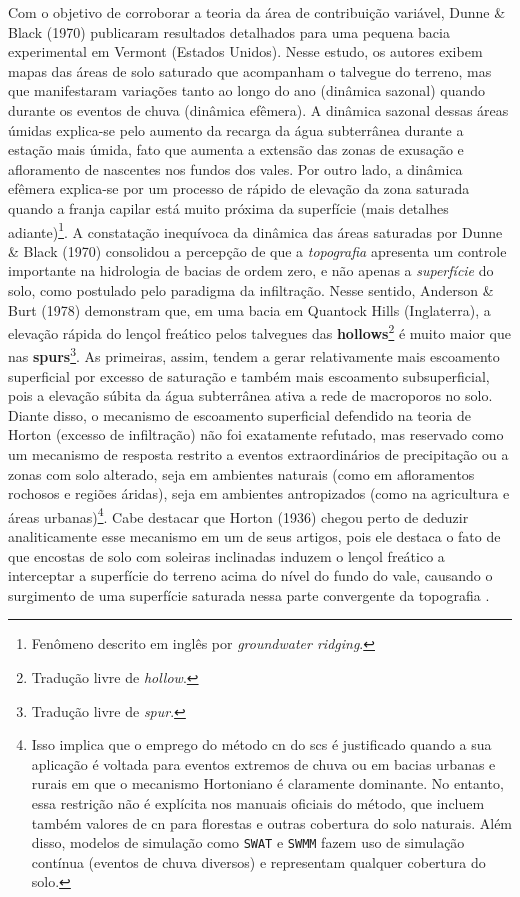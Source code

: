 \documentclass[./main.tex]{subfiles}
\begin{document}
\par Com o objetivo de corroborar a teoria da área de contribuição variável, Dunne \& Black (1970) \cite{Dunne1970} publicaram resultados detalhados para uma pequena bacia experimental em Vermont (Estados Unidos). Nesse estudo, os autores exibem mapas das áreas de solo saturado que acompanham o talvegue do terreno, mas que manifestaram variações tanto ao longo do ano (dinâmica sazonal) quando durante os eventos de chuva (dinâmica efêmera). A dinâmica sazonal dessas áreas úmidas explica-se pelo aumento da recarga da água subterrânea durante a estação mais úmida, fato que aumenta a extensão das zonas de exusação e afloramento de nascentes nos fundos dos vales. Por outro lado, a dinâmica efêmera explica-se por um processo de rápido de elevação da zona saturada quando a franja capilar está muito próxima da superfície (mais detalhes adiante)\footnote{Fenômeno descrito em inglês por \textit{groundwater ridging}.}. A constatação inequívoca da dinâmica das áreas saturadas por Dunne \& Black (1970) consolidou a percepção de que a \textit{topografia} apresenta um controle importante na hidrologia de bacias de ordem zero, e não apenas a \textit{superfície} do solo, como postulado pelo \gls{paradigma} da infiltração. Nesse sentido, Anderson \& Burt (1978) \cite{Anderson1978} demonstram que, em uma bacia em Quantock Hills (Inglaterra), a elevação rápida do lençol freático pelos talvegues das \textbf{\gls{hollows}}\footnote{Tradução livre de \textit{hollow}.} é muito maior que nas \textbf{\gls{spurs}}\footnote{Tradução livre de \textit{spur}.}. As primeiras, assim, tendem a gerar relativamente mais escoamento superficial por excesso de saturação e também mais escoamento subsuperficial, pois a elevação súbita da água subterrânea ativa a rede de macroporos no solo. Diante disso, o mecanismo de escoamento superficial defendido na teoria de Horton (excesso de infiltração) não foi exatamente refutado, mas reservado como um mecanismo de resposta restrito a eventos extraordinários de precipitação ou a zonas com solo alterado, seja em ambientes naturais (como em afloramentos rochosos e regiões áridas), seja em ambientes antropizados (como na agricultura e áreas urbanas)\footnote{Isso implica que o emprego do método \acrshort{cn} do \acrshort{scs} é justificado quando a sua aplicação é voltada para eventos extremos de chuva ou em bacias urbanas e rurais em que o mecanismo Hortoniano é claramente dominante. No entanto, essa restrição não é explícita nos manuais oficiais do método, que incluem também valores de \acrshort{cn} para florestas e outras cobertura do solo naturais. Além disso, modelos de simulação como \texttt{SWAT} e \texttt{SWMM} fazem uso de simulação contínua (eventos de chuva diversos) e representam qualquer cobertura do solo.}. Cabe destacar que Horton (1936) \cite{Horton1936} chegou perto de deduzir analiticamente esse mecanismo em um de seus artigos, pois ele destaca o fato de que encostas de solo com soleiras inclinadas induzem o lençol freático a interceptar a superfície do terreno acima do nível do fundo do vale, causando o surgimento de uma superfície saturada nessa parte convergente da topografia \cite{Beven2004b}.
\end{document}
